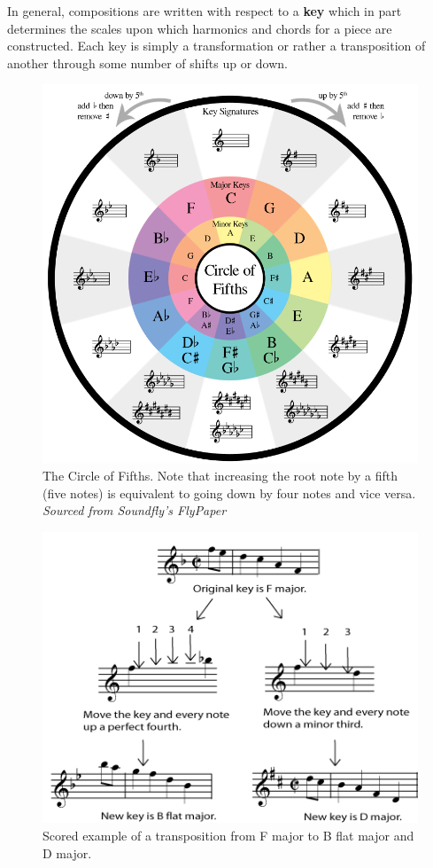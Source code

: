 \documentclass[12pt,]{article}
\begin{document}
In general, compositions are written with respect to a \textbf{key}
which in part determines the scales upon which harmonics and chords for
a piece are constructed. Each key is simply a transformation or rather a
transposition of another through some number of shifts up or down.

\begin{figure}
\centering
\includegraphics[width=\textwidth,height=0.4\textheight]{Images/flypaperfifths.png}
\caption{The Circle of Fifths. Note that increasing the root note by a
fifth (five notes) is equivalent to going down by four notes and vice
versa. \newline\textit{Sourced from Soundfly's FlyPaper}}
\end{figure}

\begin{figure}
\centering
\includegraphics[width=\textwidth,height=0.3\textheight]{Images/transp3b.png}
\caption{Scored example of a transposition from F major to B flat major
and D major.}
\end{figure}
\end{document}
